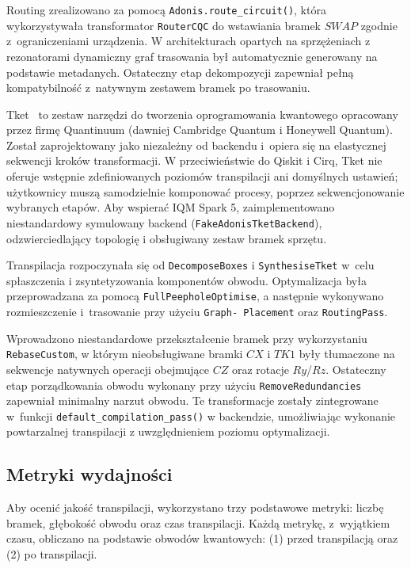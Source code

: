 Routing zrealizowano za pomocą \texttt{Adonis.route\_circuit()}, która wykorzystywała transformator \texttt{RouterCQC} do wstawiania bramek  $\mathit{SWAP}$ zgodnie z~ograniczeniami urządzenia. W architekturach opartych na sprzężeniach z rezonatorami dynamiczny graf trasowania był automatycznie generowany na podstawie metadanych. Ostateczny etap dekompozycji zapewniał pełną kompatybilność z~natywnym zestawem bramek po trasowaniu.


Tket~\cite{tket2024} to zestaw narzędzi do tworzenia oprogramowania kwantowego opracowany przez firmę Quantinuum (dawniej Cambridge Quantum i Honeywell Quantum). Został zaprojektowany jako niezależny od backendu i~opiera się na elastycznej sekwencji kroków transformacji. W przeciwieństwie do Qiskit i Cirq, Tket nie oferuje wstępnie zdefiniowanych poziomów transpilacji ani domyślnych ustawień; użytkownicy muszą samodzielnie komponować procesy, poprzez sekwencjonowanie wybranych etapów.
%
Aby wspierać IQM Spark 5, zaimplementowano niestandardowy symulowany backend (\texttt{FakeAdonisTketBackend}), odzwierciedlający topologię i obsługiwany zestaw bramek sprzętu.

Transpilacja rozpoczynała się od \texttt{DecomposeBoxes} i \texttt{SynthesiseTket} w~celu spłaszczenia i zsyntetyzowania komponentów obwodu. Optymalizacja była przeprowadzana za pomocą \texttt{FullPeepholeOptimise}, a następnie wykonywano rozmieszczenie i~trasowanie przy użyciu \texttt{Graph- Placement} oraz \texttt{RoutingPass}.

Wprowadzono niestandardowe przekształcenie bramek przy wykorzystaniu \texttt{RebaseCustom}, w którym nieobsługiwane bramki $\mathit{CX}$ i $\mathit{TK1}$ były tłumaczone na sekwencje natywnych operacji obejmujące $\mathit{CZ}$ oraz rotacje $\mathit{Ry}$/$\mathit{Rz}$. Ostateczny etap porządkowania obwodu wykonany przy użyciu  \texttt{RemoveRedundancies} zapewniał minimalny narzut obwodu. Te transformacje zostały zintegrowane w~funkcji    \texttt{default\_compilation\_pass()} w backendzie, umożliwiając wykonanie powtarzalnej transpilacji z uwzględnieniem poziomu optymalizacji.


\subsection{Metryki wydajności}

Aby ocenić jakość transpilacji, wykorzystano trzy podstawowe metryki: liczbę bramek, głębokość obwodu oraz czas transpilacji. Każdą metrykę, z~wyjątkiem czasu, obliczano na podstawie obwodów kwantowych: (1) przed transpilacją oraz (2) po transpilacji. 
%

